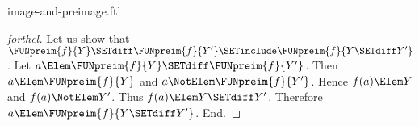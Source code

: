 \documentclass{stex}
\begin{document}
\begin{smodule}{image-and-preimage.ftl}
\begin{proof}[forthel]
  Let us show that $\FUNpreim{f}{Y} \SETdiff \FUNpreim{f}{Y'} \SETinclude \FUNpreim{f}{Y \SETdiff Y'}$.
    Let $a \Elem \FUNpreim{f}{Y} \SETdiff \FUNpreim{f}{Y'}$.
    Then $a \Elem \FUNpreim{f}{Y}$ and $a \NotElem \FUNpreim{f}{Y'}$.
    Hence $f(a) \Elem Y$ and $f(a) \NotElem Y'$.
    Thus $f(a) \Elem Y \SETdiff Y'$.
    Therefore $a \Elem \FUNpreim{f}{Y \SETdiff Y'}$.
  End.
\end{proof}
\end{smodule}
\end{document}
